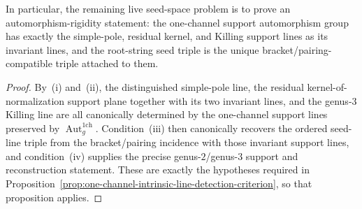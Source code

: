 \begin{proposition}
In particular, the remaining live seed-space problem is to prove an
automorphism-rigidity statement: the one-channel support automorphism
group has exactly the simple-pole, residual kernel, and Killing support
lines as its invariant lines, and the root-string seed triple is the
unique bracket/pairing-compatible triple attached to them.
\end{proposition}

\begin{proof}
By~\textup{(i)} and~\textup{(ii)}, the distinguished simple-pole line,
the residual kernel-of-normalization support plane together with its two
invariant lines, and the genus-$3$ Killing line are all canonically
determined by the one-channel support lines preserved by
$\operatorname{Aut}_g^{\mathrm{1ch}}$.  Condition~\textup{(iii)} then canonically
recovers the ordered seed-line triple from the bracket/pairing
incidence with those invariant support lines, and
condition~\textup{(iv)} supplies the precise genus-$2$/genus-$3$
support and reconstruction statement.  These are exactly the hypotheses
required in
Proposition~\ref{prop:one-channel-intrinsic-line-detection-criterion},
so that proposition applies.
\end{proof}

